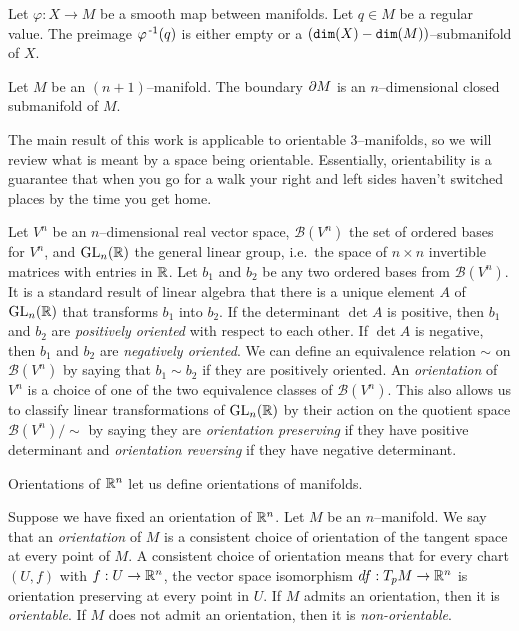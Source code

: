\begin{theorem}
	Let $\varphi:X\to M$ be a smooth map between manifolds.
	Let $q\in M$ be a regular value.
	The preimage $\varphi^{\,\text{-}1}(q)$ is either empty or a $(\texttt{dim}(X)-\texttt{dim}(M))$--submanifold of $X$.
\end{theorem}

\begin{prop}
	\label{prop:boundariesaremanifolds}
	Let $M$ be an $(n+1)$--manifold.
	The boundary $\partial M$ is an $n$--dimensional closed submanifold of $M$.
\end{prop}

The main result of this work is applicable to orientable 3--manifolds, so we will review what is meant by a space being orientable.
Essentially, orientability is a guarantee that when you go for a walk your right and left sides haven't switched places by the time you get home.

\begin{defn}
	\label{def:orientation}
	Let $V^n$ be an $n$--dimensional real vector space, $\mathcal{B}(V^n)$ the set of ordered bases for $V^n$, and $\textrm{GL}_{n}(\mathbb{R})$ the general linear group, i.e.\ the space of $n\times n$ invertible matrices with entries in $\mathbb{R}$.
	Let $b_1$ and $b_2$ be any two ordered bases from $\mathcal{B}(V^n)$.
	It is a standard result of linear algebra that there is a unique element $A$ of $\textrm{GL}_{n}(\mathbb{R})$ that transforms $b_1$ into $b_2$.
	If the determinant $\det A$ is positive, then $b_1$ and $b_2$ are \emph{positively oriented} with respect to each other.
	If $\det A$ is negative, then $b_1$ and $b_2$ are \emph{negatively oriented}.
	We can define an equivalence relation $\sim$ on $\mathcal{B}(V^n)$ by saying that $b_1\sim b_2$ if they are positively oriented.
	An \emph{orientation} of $V^n$ is a choice of one of the two equivalence classes of $\mathcal{B}(V^n)$.
	This also allows us to classify linear transformations of $\textrm{GL}_{n}(\mathbb{R})$ by their action on the quotient space $\mathcal{B}(V^n)/\sim$ by saying they are \emph{orientation preserving} if they have positive determinant and \emph{orientation reversing} if they have negative determinant.
\end{defn}

Orientations of $\mathbb{R}^n$ let us define orientations of manifolds.

\begin{defn}
	Suppose we have fixed an orientation of $\mathbb{R}^n$.
	Let $M$ be an $n$--manifold.
	We say that an \emph{orientation} of $M$ is a consistent choice of orientation of the tangent space at every point of $M$.
	A consistent choice of orientation means that for every chart $(U,f)$ with $f:U\to\mathbb{R}^n$, the vector space isomorphism $df:T_p M\to \mathbb{R}^n$ is orientation preserving at every point in $U$. 
	If $M$ admits an orientation, then it is \emph{orientable}.
	If $M$ does not admit an orientation, then it is \emph{non-orientable}.	
\end{defn}

